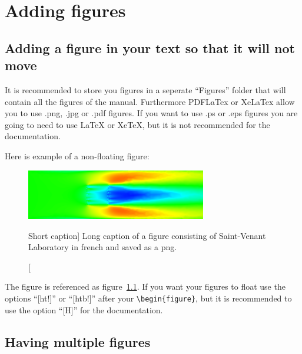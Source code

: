 \chapter{Adding figures}

\section[Short section title]{Adding a figure in your text so that it will not move}

It is recommended to store you figures in a seperate ``Figures'' folder that
will contain all the figures of the manual. Furthermore PDFLaTex or XeLaTex
allow you to use .png, .jpg or .pdf figures. If you want to use .ps or .eps
figures you are going to need to use LaTeX or XeTeX, but it is not recommended
for the \telemacsystem{} documentation.

Here is example of a non-floating figure:

\begin{figure}[H]%
\begin{center}
%
  \includegraphics[width=0.7\textwidth]{./FigExample/ExampleImage}
%
\end{center}
\caption
[Short caption]
{Long caption of a figure consisting of Saint-Venant Laboratory in french and
saved as a png\protect\footnotemark.}
\label{fig:ExampleImage}
\end{figure}

The figure is referenced as figure~\ref{fig:ExampleImage}. If you want your
figures to float use the options ``[ht!]'' or ``[htb!]'' after your
\verb+\begin{figure}+, but it is recommended to use the option ``[H]'' for the
\telemacsystem{} documentation.

\section{Having multiple figures}

